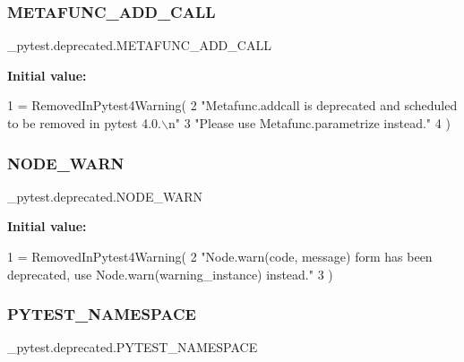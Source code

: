 \subsubsection{\texorpdfstring{M\+E\+T\+A\+F\+U\+N\+C\+\_\+\+A\+D\+D\+\_\+\+C\+A\+LL}{METAFUNC\_ADD\_CALL}}
{\footnotesize\ttfamily \+\_\+pytest.\+deprecated.\+M\+E\+T\+A\+F\+U\+N\+C\+\_\+\+A\+D\+D\+\_\+\+C\+A\+LL}

{\bfseries Initial value\+:}
\begin{DoxyCode}
1 =  RemovedInPytest4Warning(
2     \textcolor{stringliteral}{"Metafunc.addcall is deprecated and scheduled to be removed in pytest 4.0.\(\backslash\)n"}
3     \textcolor{stringliteral}{"Please use Metafunc.parametrize instead."}
4 )
\end{DoxyCode}
\mbox{\label{namespace__pytest_1_1deprecated_ad78f70b611cec03c057a50f5f20f6176}} 
\subsubsection{\texorpdfstring{N\+O\+D\+E\+\_\+\+W\+A\+RN}{NODE\_WARN}}
{\footnotesize\ttfamily \+\_\+pytest.\+deprecated.\+N\+O\+D\+E\+\_\+\+W\+A\+RN}

{\bfseries Initial value\+:}
\begin{DoxyCode}
1 =  RemovedInPytest4Warning(
2     \textcolor{stringliteral}{"Node.warn(code, message) form has been deprecated, use Node.warn(warning\_instance) instead."}
3 )
\end{DoxyCode}
\mbox{\label{namespace__pytest_1_1deprecated_ad2738cbdf49a2a362b359b206072475b}} 
\subsubsection{\texorpdfstring{P\+Y\+T\+E\+S\+T\+\_\+\+N\+A\+M\+E\+S\+P\+A\+CE}{PYTEST\_NAMESPACE}}
{\footnotesize\ttfamily \+\_\+pytest.\+deprecated.\+P\+Y\+T\+E\+S\+T\+\_\+\+N\+A\+M\+E\+S\+P\+A\+CE}


